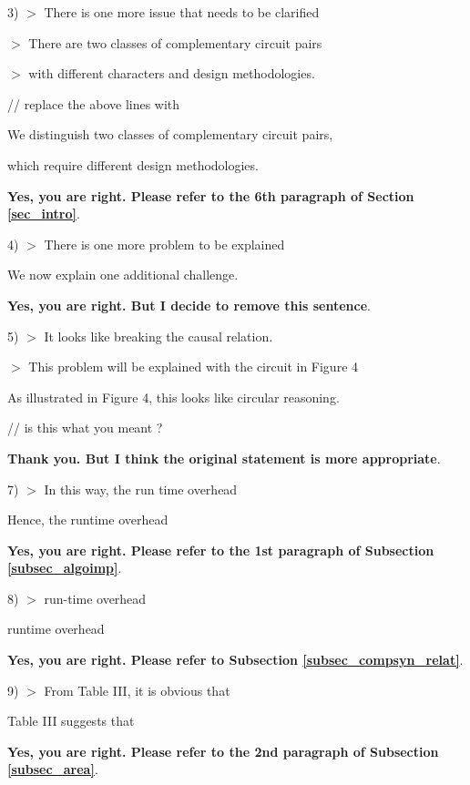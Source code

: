 \documentclass[journal]{IEEEtran}
\begin{document}
{\bigskip


3) $>$ There is one more issue that needs to be clarified

$>$ There are two classes of complementary circuit pairs

 $>$ with different characters and design methodologies.

\smallskip

// replace the above lines with

  We distinguish two classes of complementary circuit pairs,

  which require different design methodologies.

\smallskip
\textbf{Yes,
you are right.
Please refer to the 6th paragraph of Section  \ref{sec_intro}}.

\bigskip

4) $>$ There is one more problem to be explained

  We now explain one additional challenge.

\smallskip
\textbf{Yes,
you are right.
But I decide to remove this sentence}.

\bigskip

5) $>$ It looks like breaking the causal relation.

$>$ This problem will be explained with the circuit in Figure 4

  As illustrated in Figure 4, this looks like circular reasoning.

// is this what you meant ?

\smallskip
\textbf{Thank you.
But I think the original statement is more appropriate}.

\bigskip

7) $>$ In this way, the run time overhead

  Hence, the runtime overhead

\smallskip
\textbf{Yes,
you are right.
Please refer to the 1st paragraph of Subsection  \ref{subsec_algoimp}}.

\bigskip

8) $>$ run-time overhead

runtime overhead

\smallskip
\textbf{Yes,
you are right.
Please refer to Subsection  \ref{subsec_compsyn_relat}}.

\bigskip

9) $>$ From Table III, it is obvious that

  Table III suggests that

\smallskip
\textbf{Yes,
you are right.
Please refer to the 2nd paragraph of Subsection  \ref{subsec_area}}.

}
\end{document}
